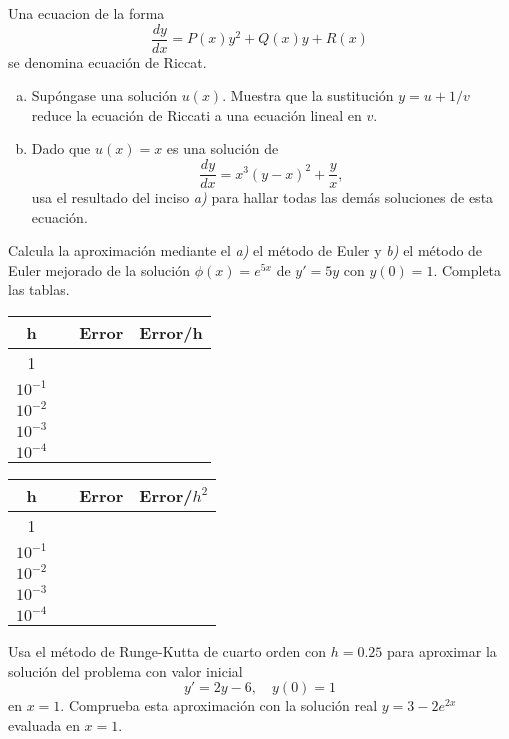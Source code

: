 \documentclass[12pt]{exam}
\begin{document}
\begin{questions}
     \question
     Una ecuacion de la forma $$\frac{dy}{dx}=P(x)y^2+Q(x)y+R(x)$$ se denomina ecuación de Riccat.
     \begin{enumerate}[a)]
     		\item Supóngase una solución $u(x)$. Muestra que la sustitución $y=u+1/v$ reduce la ecuación de Riccati a una ecuación lineal en $v$.
            \item Dado que $u(x)=x$ es una solución de $$\frac{dy}{dx}=x^3(y-x)^2+\frac{y}{x},$$ usa el resultado del inciso \textit{a)} para hallar todas las demás soluciones de esta ecuación.
     \end{enumerate}

     \question
     Calcula la aproximación mediante el \textit{a)} el método de Euler y \textit{b)} el método de Euler mejorado de la solución $\phi(x)=e^{5x}$ de $y'=5y$ con $y(0)=1$. Completa las tablas.
    
    \small
     \begin{tabular}{cm{2.5cm}cc}
     \hline
     h&\centering{Aproximación de Euler}&Error&Error/h\\
     \hline
     1\\
     $10^{-1}$\\
     $10^{-2}$\\
     $10^{-3}$\\
     $10^{-4}$\\
     \hline
     \end{tabular}
     \begin{tabular}{cm{3cm}cc}
     \hline
     h&\centering{Aproximación de Euler mejorado}&Error&Error/$h^2$\\
     \hline
     1\\
     $10^{-1}$\\
     $10^{-2}$\\
     $10^{-3}$\\
     $10^{-4}$\\
     \hline
     \end{tabular}
     
  
     

     \question
     Usa el método de Runge-Kutta de cuarto orden con $h=0.25$ para aproximar la solución del problema con valor inicial $$y'=2y-6,\quad y(0)=1$$ en $x=1$. Comprueba esta aproximación con la solución real $y=3-2e^{2x}$ evaluada en $x=1$.

        \end{questions}
        \vskip30pt
\end{document}
